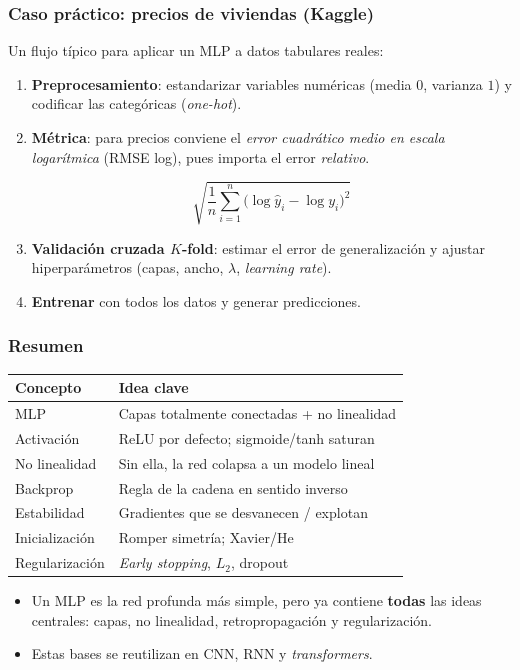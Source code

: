 \documentclass[aspectratio=169, 10pt]{beamer}
\newcommand{\formula}[1]{%
	\begin{tcolorbox}[colback=UCMBlue!8, colframe=UCMBlue, arc=4pt,
		boxsep=2pt, left=6pt, right=6pt, top=3pt, bottom=3pt]
		#1
	\end{tcolorbox}
}
\begin{document}
\begin{frame}
\frametitle{Caso pr\'actico: precios de viviendas (Kaggle)}
Un flujo t\'ipico para aplicar un MLP a datos tabulares reales:
\begin{enumerate}
	\item \textbf{Preprocesamiento}: estandarizar variables num\'ericas (media $0$, varianza $1$) y codificar las categ\'oricas (\emph{one-hot}).
	\item \textbf{M\'etrica}: para precios conviene el \emph{error cuadr\'atico medio en escala logar\'itmica} (RMSE log), pues importa el error \emph{relativo}.
	\formula{\[
	\sqrt{\frac{1}{n}\sum_{i=1}^{n}\big(\log \hat{y}_i - \log y_i\big)^2}
	\]}
	\item \textbf{Validaci\'on cruzada $K$-fold}: estimar el error de generalizaci\'on y ajustar hiperpar\'ametros (capas, ancho, $\lambda$, \emph{learning rate}).
	\item \textbf{Entrenar} con todos los datos y generar predicciones.
\end{enumerate}
\end{frame}

\begin{frame}
\frametitle{Resumen}
\begin{center}
\begin{tabular}{ll}
\toprule
\textbf{Concepto} & \textbf{Idea clave}\\
\midrule
MLP             & Capas totalmente conectadas + no linealidad\\
Activaci\'on    & ReLU por defecto; sigmoide/tanh saturan\\
No linealidad   & Sin ella, la red colapsa a un modelo lineal\\
Backprop        & Regla de la cadena en sentido inverso\\
Estabilidad     & Gradientes que se desvanecen / explotan\\
Inicializaci\'on& Romper simetr\'ia; Xavier/He\\
Regularizaci\'on& \emph{Early stopping}, $L_2$, dropout\\
\bottomrule
\end{tabular}
\end{center}
\vspace{0.8em}
\begin{itemize}
	\item Un MLP es la red profunda m\'as simple, pero ya contiene \textbf{todas} las ideas centrales: capas, no linealidad, retropropagaci\'on y regularizaci\'on.
	\item Estas bases se reutilizan en CNN, RNN y \emph{transformers}.
\end{itemize}
\end{frame}
\end{document}
